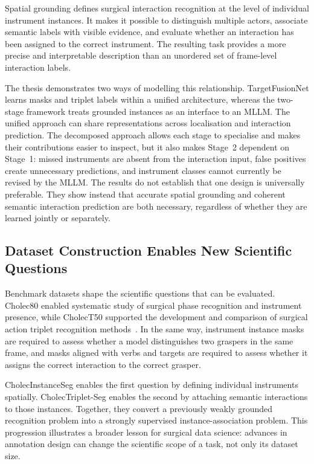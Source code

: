 Spatial grounding defines surgical interaction recognition at the level of individual instrument instances. It makes it possible to distinguish multiple actors, associate semantic labels with visible evidence, and evaluate whether an interaction has been assigned to the correct instrument. The resulting task provides a more precise and interpretable description than an unordered set of frame-level interaction labels.

The thesis demonstrates two ways of modelling this relationship. TargetFusionNet learns masks and triplet labels within a unified architecture, whereas the two-stage framework treats grounded instances as an interface to an MLLM. The unified approach can share representations across localisation and interaction prediction. The decomposed approach allows each stage to specialise and makes their contributions easier to inspect, but it also makes Stage~2 dependent on Stage~1: missed instruments are absent from the interaction input, false positives create unnecessary predictions, and instrument classes cannot currently be revised by the MLLM. The results do not establish that one design is universally preferable. They show instead that accurate spatial grounding and coherent semantic interaction prediction are both necessary, regardless of whether they are learned jointly or separately.

\subsection{Dataset Construction Enables New Scientific Questions}
\label{sec:discussion-dataset-insight}

Benchmark datasets shape the scientific questions that can be evaluated. Cholec80 enabled systematic study of surgical phase recognition and instrument presence, while CholecT50 supported the development and comparison of surgical action triplet recognition methods~\cite{EndoNet,NWOYE2022102433_rendevous}. In the same way, instrument instance masks are required to assess whether a model distinguishes two graspers in the same frame, and masks aligned with verbs and targets are required to assess whether it assigns the correct interaction to the correct grasper.

CholecInstanceSeg enables the first question by defining individual instruments spatially. CholecTriplet-Seg enables the second by attaching semantic interactions to those instances. Together, they convert a previously weakly grounded recognition problem into a strongly supervised instance-association problem. This progression illustrates a broader lesson for surgical data science: advances in annotation design can change the scientific scope of a task, not only its dataset size.

